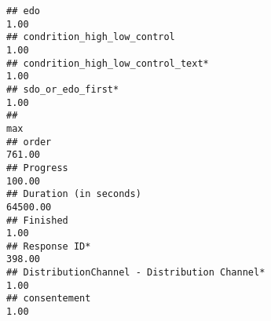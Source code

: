 \documentclass[
]{article}
\begin{document}
\begin{verbatim}
## edo                                                                                                                                                                                                                         1.00
## condrition_high_low_control                                                                                                                                                                                                 1.00
## condrition_high_low_control_text*                                                                                                                                                                                           1.00
## sdo_or_edo_first*                                                                                                                                                                                                           1.00
##                                                                                                                                                                                                                                 max
## order                                                                                                                                                                                                                        761.00
## Progress                                                                                                                                                                                                                     100.00
## Duration (in seconds)                                                                                                                                                                                                      64500.00
## Finished                                                                                                                                                                                                                       1.00
## Response ID*                                                                                                                                                                                                                 398.00
## DistributionChannel - Distribution Channel*                                                                                                                                                                                    1.00
## consentement                                                                                                                                                                                                                   1.00

\end{verbatim}
\end{document}
